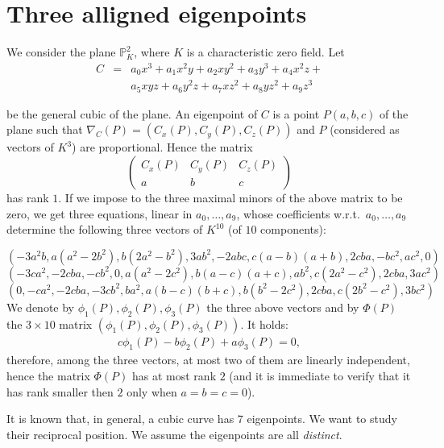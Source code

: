 \documentclass{amsart}
\theoremstyle{plain}
\theoremstyle{definition}
\begin{document}
\section{Three alligned eigenpoints}
We consider the plane $\mathbb{P}^2_K$, where $K$ is a characteristic zero
field.
Let
\begin{equation}
  \begin{array}{lcr}
  C &=& a_0x^3 + a_1x^2y + a_2xy^2 + a_3y^3 + a_4x^2z +\\
  & & a_5xyz + a_6y^2z + a_7xz^2 + a_8yz^2 + a_9z^3
  \end{array}
    \label{cubicaGen}
\end{equation}

be the general cubic of the plane. An eigenpoint of $C$ is a point
$P(a, b, c)$ of the plane such that $\nabla_C(P) =
\left(C_x(P), C_y(P), C_z(P)\right)$
and $P$ (considered as
vectors of $K^3$) are proportional.  Hence the matrix
\[ \left(
\begin{array}{ccc}
  C_x(P) & C_y(P) & C_z(P) \\
  a & b& c
\end{array}
\right)
\]
has rank $1$. 
If we impose to the three maximal minors of the above matrix to be zero,
we get three equations, linear in 
$a_0, \dots, a_9$, whose coefficients  w.r.t.\
$a_0, \dots, a_9$ 
determine the following three vectors of $K^{10}$ (of $10$ components):

{\small
\[(-3a^2b, a(a^2 - 2b^2), b(2a^2 - b^2), 3ab^2,
 -2abc, c(a - b)(a + b), 2  c  b  a,
 -b  c^2, a  c^2, 0)
\]
\[
(-3ca^2,
-2cba,
-cb^2,
0,
a(a^2-2c^2),
b(a-c)(a+c),
ab^2,
c(2a^2-c^2),
2cba,
3ac^2)
\]
\[
(0,
-ca^2,
-2cba,
-3cb^2,
ba^2,
a(b-c)(b+c),
b(b^2-2c^2),
2cba,
c(2b^2-c^2),
3bc^2)
\]
}
We denote by  $\phi_1(P), \phi_2(P), \phi_3(P)$ the three above vectors
and by $\Phi(P)$ the $3\times 10$ matrix $(\phi_1(P), \phi_2(P), \phi_3(P))$.
It holds:
\begin{eqnarray}
  c\phi_1(P)-b\phi_2(P)+a\phi_3(P) = 0,
  \label{eqBase}
\end{eqnarray}
therefore,
among the three vectors, at most two of them are linearly independent,
hence the matrix $\Phi(P)$ has at most rank $2$ (and it is immediate to
verify that it has rank smaller then $2$ only when $a=b=c=0$).

It is known that, in general, a cubic curve has $7$ eigenpoints.
We want
to study their reciprocal position. We assume the
eigenpoints are all \emph{distinct}. 
\end{document}
